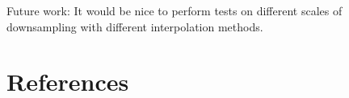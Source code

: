 \documentclass[a4paper,11pt]{article}
\begin{document}
Future work:
It would be nice to perform tests on different scales of downsampling with
different interpolation methods.



\section{References} 


\renewcommand\bibname{References}


\end{document}
